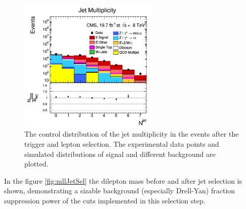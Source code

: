 \begin{itemize}
 \begin{figure}[h]
  \centering
  \includegraphics[width=0.6\textwidth]{04_event_reconstruction/plots/JetMulti.png}
  \caption{The control distribution of the jet multiplicity in the events after the trigger and lepton selection. The experimental data points
  and simulated distributions of signal and different background are plotted.}
  \label{fig:jetMultiSel}
 \end{figure}
 
 In the figure \ref{fig:mllJetSel} the dilepton mass before and after jet selection is shown, demonstrating a sizable background (especially Drell-Yan) fraction suppression power
 of the cuts implemented in this selection step.
 

\end{itemize}
